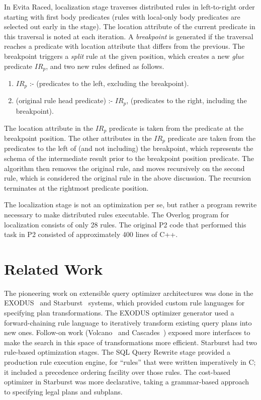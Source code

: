 \documentclass{sigmod08}
\def\compactify{\itemsep=0pt \topsep=0pt \partopsep=0pt \parsep=0pt}
\let\latexusecounter=\usecounter
\newenvironment{CompactEnumerate}
   {\def\usecounter{\compactify\latexusecounter}
    \begin{enumerate}}
   {\end{enumerate}\let\usecounter=\latexusecounter}
\begin{document}
In Evita Raced, localization stage traverses distributed rules in
left-to-right order starting with first body predicates (rules with
local-only body predicates are selected out early in the stage). 
The location attribute of the current predicate in this traversal is noted at each iteration.
A {\em breakpoint} is generated if the traversal reaches a predicate with location attribute 
that differs from the previous. The breakpoint triggers a {\em split} rule at the given 
position, which creates a new {\em glue} predicate $IR_p$, and two new rules defined as follows.
\begin{CompactEnumerate}
\item $IR_p$ :- (predicates to the left, excluding the breakpoint).
\item (original rule head predicate) :- $IR_p$, (predicates to the right, including the breakpoint). 
\end{CompactEnumerate}
The location attribute in the $IR_p$ predicate is taken from the predicate at the breakpoint position.
The other attributes in the $IR_p$ predicate are taken from the predicates to the left of (and not 
including) the breakpoint, which represents the schema of the intermediate result prior to the
breakpoint position predicate. The algorithm then removes the original rule, and moves recursively on
the second rule, which is considered the original rule in the above discussion. 
The recursion terminates at the rightmost predicate position. 

The localization stage is not an optimization per se, but rather a  program rewrite necessary to make distributed rules executable. 
The Overlog program for localization consists of only 28 rules. The original P2
code that performed this task in P2 consisted of approximately 400 lines of
C++.  








\section{Related Work}
The pioneering work on extensible query optimizer architectures was done in the EXODUS~\cite{exodus} and Starburst~\cite{lohman,phh92} systems, which provided custom rule languages for specifying plan transformations.  The EXODUS optimizer generator used a forward-chaining rule language to iteratively transform existing query plans into new ones. Follow-on work (Volcano~\cite{volcano} and Cascades~\cite{cascades}) exposed more interfaces to make the search in this space of transformations more efficient.  Starburst had two rule-based optimization stages.  The SQL Query Rewrite stage provided a production rule execution engine, for ``rules'' that were written imperatively in C; it included a precedence ordering facility over those rules.  The cost-based optimizer in Starburst was more declarative, taking a grammar-based approach to specifying legal plans and subplans.
\end{document}

